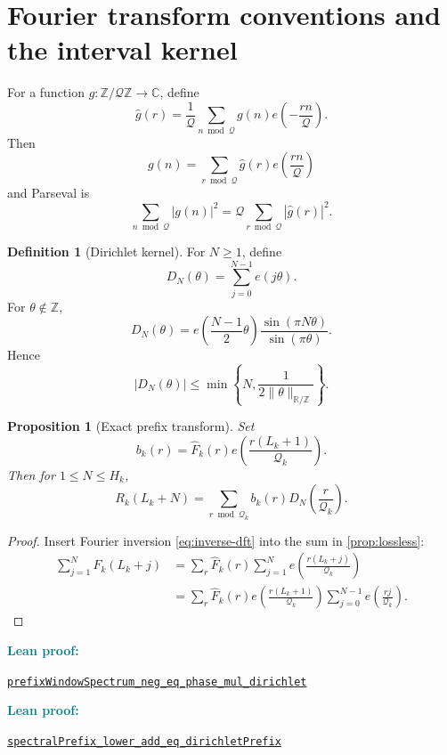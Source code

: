 \documentclass[11pt]{article}
\newtheorem{proposition}[theorem]{Proposition}
\theoremstyle{definition}
\newtheorem{definition}[theorem]{Definition}
\newcommand{\Z}{\mathbb Z}
\newcommand{\C}{\mathbb C}
\newcommand{\R}{\mathbb R}
\newcommand{\leanxref}[3]{%
  \par\smallskip
  {\small\noindent\textcolor{teal}{\textbf{#1:}}\par
  \noindent\href{#3}{\nolinkurl{#2}}\par}
  \smallskip
}
\begin{document}
\section{Fourier transform conventions and the interval kernel}

For a function $g:\Z/\mathcal Q\Z\to\C$, define
\begin{equation}\label{eq:dft}
\widehat g(r)=\frac1{\mathcal Q}\sum_{n\bmod\mathcal Q}g(n)e\!\left(-\frac{rn}{\mathcal Q}\right).
\end{equation}
Then
\begin{equation}\label{eq:inverse-dft}
g(n)=\sum_{r\bmod\mathcal Q}\widehat g(r)e\!\left(\frac{rn}{\mathcal Q}\right)
\end{equation}
and Parseval is
\begin{equation}\label{eq:parseval}
\sum_{n\bmod\mathcal Q}|g(n)|^2
=\mathcal Q\sum_{r\bmod\mathcal Q}|\widehat g(r)|^2.
\end{equation}

\begin{definition}[Dirichlet kernel]\label{def:dirichlet}
For $N\ge1$, define
\[
D_N(\theta)=\sum_{j=0}^{N-1}e(j\theta).
\]
For $\theta\notin\Z$,
\[
D_N(\theta)
=e\!\left(\frac{N-1}{2}\theta\right)
\frac{\sin(\pi N\theta)}{\sin(\pi\theta)}.
\]
Hence
\begin{equation}\label{eq:dirichlet-bound}
|D_N(\theta)|\le
\min\left\{N,\frac1{2\|\theta\|_{\R/\Z}}\right\}.
\end{equation}
\end{definition}

\begin{proposition}[Exact prefix transform]\label{prop:prefix-transform}
Set
\[
b_k(r)=\widehat F_k(r)e\!\left(\frac{r(L_k+1)}{\mathcal Q_k}\right).
\]
Then for $1\le N\le H_k$,
\begin{equation}\label{eq:exact-dirichlet-pairing}
\boxed{
R_k(L_k+N)
=
\sum_{r\bmod\mathcal Q_k}
 b_k(r)D_N\!\left(\frac r{\mathcal Q_k}\right).}
\end{equation}
\end{proposition}

\begin{proof}
Insert Fourier inversion \eqref{eq:inverse-dft} into the sum in \cref{prop:lossless}:
\begin{align*}
\sum_{j=1}^{N}F_k(L_k+j)
&=\sum_{r}\widehat F_k(r)
  \sum_{j=1}^{N}e\!\left(\frac{r(L_k+j)}{\mathcal Q_k}\right)\\
&=\sum_r \widehat F_k(r)e\!\left(\frac{r(L_k+1)}{\mathcal Q_k}\right)
  \sum_{j=0}^{N-1}e\!\left(\frac{rj}{\mathcal Q_k}\right).
\end{align*}
\end{proof}
\leanxref{Lean proof}{prefixWindowSpectrum_neg_eq_phase_mul_dirichlet}{https://github.com/OVVO-Financial/prime-wheel-mobius/blob/main/formalization/RHLean/Analysis/PrimeWheelDirichletResponse.lean}
\leanxref{Lean proof}{spectralPrefix_lower_add_eq_dirichletPrefix}{https://github.com/OVVO-Financial/prime-wheel-mobius/blob/main/formalization/RHLean/Analysis/PrimeWheelDirichletResponse.lean}
\end{document}
